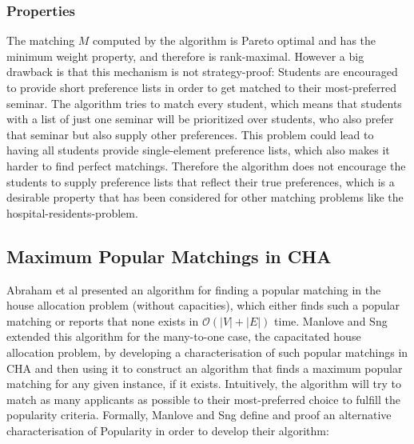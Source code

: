 \subsubsection{Properties}
The matching $M$ computed by the algorithm is Pareto optimal\cite{SngThesis} and has the minimum weight property, and therefore is rank-maximal.\cite{SngThesis} However a big drawback is that this mechanism is not strategy-proof: Students are encouraged to provide short preference lists in order to get matched to their most-preferred seminar. The algorithm tries to match every student, which means that students with a list of just one seminar will be prioritized over students, who also prefer that seminar but also supply other preferences. This problem could lead to having all students provide single-element preference lists, which also makes it harder to find perfect matchings. Therefore the algorithm does not encourage the students to supply preference lists that reflect their true preferences, which is a desirable property that has been considered for other matching problems like the hospital-residents-problem.\cite{Gusfield}

\subsection{Maximum Popular Matchings in CHA}
Abraham et al \cite{AbrahamPopular} presented an algorithm for finding a popular matching in the house allocation problem (without capacities), which either finds such a popular matching or reports that none exists in $\mathcal{O}(|V| + |E|)$ time. Manlove and Sng \cite{ManlovePopularMatchings} extended this algorithm for the many-to-one case, the capacitated house allocation problem, by developing a characterisation of such popular matchings in CHA and then using it to construct an algorithm that finds a maximum popular matching for any given instance, if it exists. 
Intuitively, the algorithm will try to match as many applicants as possible to their most-preferred choice to fulfill the popularity criteria. Formally, Manlove and Sng\cite{ManlovePopularMatchings} define and proof an alternative characterisation of Popularity in order to develop their algorithm:

